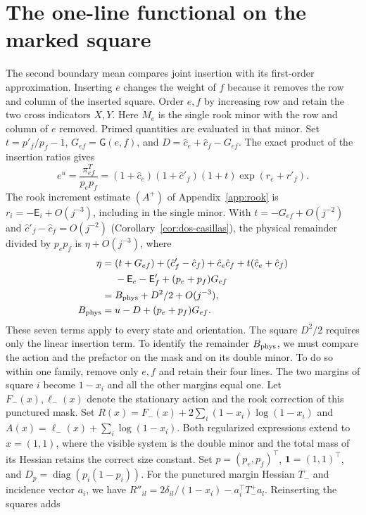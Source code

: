 \section{The one-line functional on the marked square}\label{app:weights} The second boundary mean
compares joint insertion with its first-order approximation. Inserting \(e\) changes the weight of \(f\)
because it removes the row and column of the inserted square. Order \(e,f\) by increasing row and retain
the two cross indicators \(X,Y\). Here \(M_e\) is the single rook minor with the row and column of \(e\)
removed. Primed quantities are evaluated in that minor. Set \(t=p'_f/p_f-1\), \(G_{ef}=\mathsf G(e,f)\),
and \(D=\hat c_e+\hat c_f-G_{ef}\). The exact product of the insertion ratios gives \[
 e^{u}=\frac{\pi^T_{ef}}{p_ep_f}
      =(1+\hat c_e)(1+\hat c'_f)(1+t)\exp(r_e+r'_f).
\] The rook increment estimate \((A^+)\) of Appendix~\ref{app:rook} is
\(r_i=-\mathsf E_i+O(j^{-3})\), including in the single minor. With \(t=-G_{ef}+O(j^{-2})\) and \(\hat
c'_f-\hat c_f=O(j^{-2})\)
(Corollary~\ref{cor:dos-casillas}), the physical remainder divided by
\(p_ep_f\) is
\(\eta+O(j^{-3})\), where \begin{align*}
 \eta={}&(t+G_{ef})+(\hat c'_f-\hat c_f)+\hat c_e\hat c_f+t(\hat c_e+\hat c_f)\\
        &-\mathsf E_e-\mathsf E'_f+(p_e+p_f)G_{ef}\\
     ={}&B_{\rm phys}+D^2/2+O(j^{-3}),\\
 B_{\rm phys}={}&u-D+(p_e+p_f)G_{ef}.
\end{align*} These seven terms apply to every state and orientation. The square \(D^2/2\) requires only
the linear insertion term. To identify the remainder \(B_{\rm phys}\), we must compare the action and the
prefactor on the mask and on its double minor. To do so within one family, remove only \(e,f\) and retain
their four lines. The two margins of square \(i\) become \(1-x_i\) and all the other margins equal one.
Let \(F_-(x),\ell_-(x)\) denote the stationary action and the rook correction of this punctured mask. Set
\(R(x)=F_-(x)+2\sum_i(1-x_i)\log(1-x_i)\) and \(A(x)=\ell_-(x)+\sum_i\log(1-x_i)\). Both regularized
expressions extend to \(x=(1,1)\), where the visible system is the double minor and the total mass of its
Hessian retains the correct size constant. Set \(p=(p_e,p_f)^\top\), \(\mathbf1=(1,1)^\top\), and
\(D_p=\operatorname{diag}(p_i(1-p_i))\). For the punctured margin Hessian \(T_-\) and incidence vector
\(a_i\), we have \(R''_{il}=2\delta_{il}/(1-x_i)-a_i^\top T_-^+a_l\). Reinserting the squares adds
